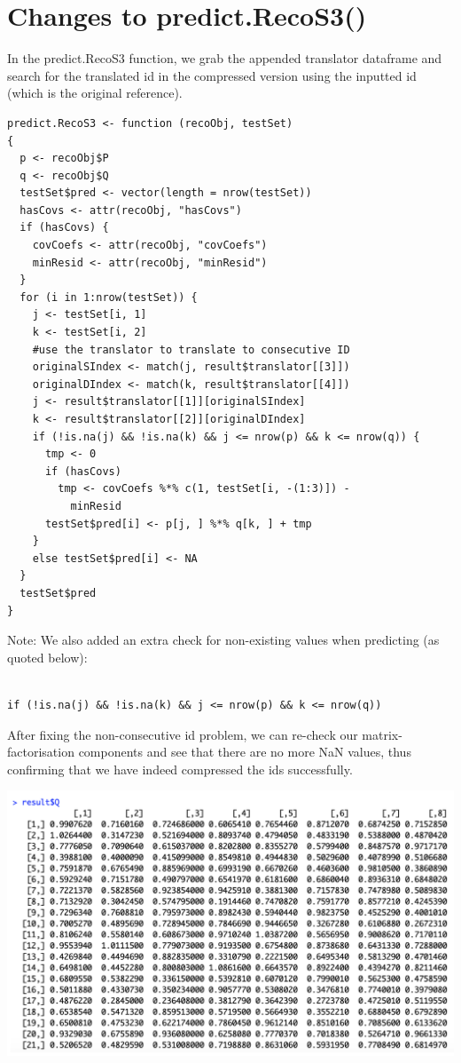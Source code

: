 \documentclass{article}
\begin{document}
\section{Changes to predict.RecoS3()}

In the predict.RecoS3 function, we grab the appended translator dataframe and search for the translated id in the compressed version using the inputted id (which is the original reference).

\begin{verbatim}
predict.RecoS3 <- function (recoObj, testSet) 
{
  p <- recoObj$P
  q <- recoObj$Q
  testSet$pred <- vector(length = nrow(testSet))
  hasCovs <- attr(recoObj, "hasCovs")
  if (hasCovs) {
    covCoefs <- attr(recoObj, "covCoefs")
    minResid <- attr(recoObj, "minResid")
  }
  for (i in 1:nrow(testSet)) {
    j <- testSet[i, 1]
    k <- testSet[i, 2]
    #use the translator to translate to consecutive ID
    originalSIndex <- match(j, result$translator[[3]])
    originalDIndex <- match(k, result$translator[[4]])
    j <- result$translator[[1]][originalSIndex]
    k <- result$translator[[2]][originalDIndex]
    if (!is.na(j) && !is.na(k) && j <= nrow(p) && k <= nrow(q)) {
      tmp <- 0
      if (hasCovs) 
        tmp <- covCoefs %*% c(1, testSet[i, -(1:3)]) - 
          minResid
      testSet$pred[i] <- p[j, ] %*% q[k, ] + tmp
    }
    else testSet$pred[i] <- NA
  }
  testSet$pred
}
\end{verbatim}

Note: We also added an extra check for non-existing values when predicting (as quoted below):

\begin{verbatim}

if (!is.na(j) && !is.na(k) && j <= nrow(p) && k <= nrow(q))

\end{verbatim}

After fixing the non-consecutive id problem, we can re-check our matrix-factorisation components and see that there are no more NaN values, thus confirming that we have indeed compressed the ids successfully.

\includegraphics[scale=0.5]{ItemIDFixedExample.png}
\end{document}
